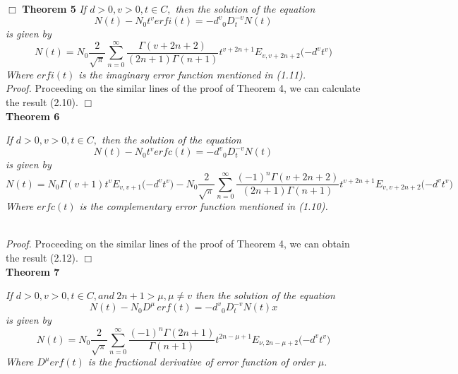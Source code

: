 \documentclass[leqno]{article}
\begin{document}
\hfill$\Box$
\medskip
\newline
\noindent
{\bf Theorem 5}
{\it If $d > 0, v > 0, t \in C,$ then the solution of the equation
\begin{equation}
    N(t) - N_0{t^v}erfi(t) = {-d^v}{_0D_t^{-v}}N(t)
\end{equation}
is given by
\begin{equation}
    N(t) = N_0
    \frac{2}{\sqrt{\pi}}
    \sum_{n = 0}^{\infty}
    \frac{\Gamma{(v+2n+2)}}{{(2n+1)}\Gamma{(n+1)}}
    t^{v+2n+1}
    E_{v,v+2n+2}
    \Big({-d^v}{t^v}\Big)
\end{equation}
Where $erfi(t)$ is the imaginary error function mentioned in (1.11).
}
\vspace{0.05in}\\
%
\noindent
{\it Proof.} Proceeding on the similar lines of the proof of Theorem 4, we can calculate the result (2.10).
\hfill$\Box$
\medskip
\noindent
\\
{\bf Theorem 6}
{\it 
If $d > 0, v > 0, t \in C,$ then the solution of the equation
\begin{equation}
    N(t) - N_0{t^v}erfc(t) = {-d^v}{_0D_t^{-v}}N(t)
\end{equation}
is given by
\begin{equation}
    N(t) = N_0
    \Gamma{(v+1)}
    {t^v}E_{v,v+1}
    \big({-d^v}{t^v}\big)
    -{N_0}\frac{2}{\sqrt{\pi}}
    \sum_{n = 0}^{\infty}
    \frac{{(-1)^n}\Gamma{(v+2n+2)}}{{(2n+1)}\Gamma{(n+1)}}
    t^{v+2n+1}
    E_{v,v+2n+2}
    \Big({-d^v}{t^v}\Big)
\end{equation}
Where $erfc(t)$ is the complementary error function mentioned in (1.10).

}
\vspace{0.05in}\\
%
{\it Proof.} 
Proceeding on the similar lines of the proof of Theorem 4, we can obtain the result (2.12).
\hfill$\Box$
\medskip
\noindent
\\
{\bf Theorem 7}
{\it 
If $d > 0, v > 0, t \in C, and\ {2n+1} > \mu , \mu \neq {v} $ then the solution of the equation
\begin{equation}
    N(t) - {N_0} {D^{\mu}} \, erf(t) = {-d^v}{_0D_t^{-v}}N(t)x
\end{equation}
is given by
\begin{equation}
    N(t) = N_0
    \frac{2}{\sqrt{\pi}}
    \sum_{n = 0}^{\infty}
    \frac{{(-1)^n}\Gamma{(2n+1)}}{{\Gamma{(n+1)}}}
    t^{2n-{\mu}+1}
    E_{\nu,2n- \mu +2}
    \Big({-d^v}{t^v}\Big)
\end{equation}
Where $D^{\mu}erf(t)$ is the fractional derivative of error function of order $\mu$.

}
\end{document}
